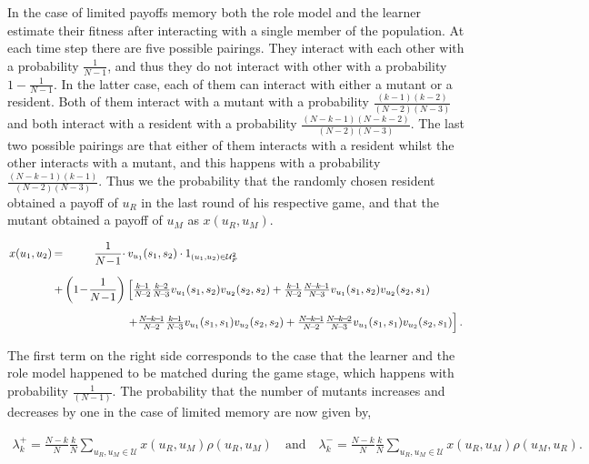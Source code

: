 \documentclass[11pt]{article}
\theoremstyle{plainCl1}
\theoremstyle{plainCl2}
\begin{document}
In the case of limited payoffs memory both the role model and the learner
estimate their fitness after interacting with a single member of the population.
At each time step there are five possible pairings. They interact with each
other with a probability \(\frac{1}{N - 1}\), and thus they do not interact with
other with a probability \(1 - \frac{1}{N - 1}\). In the latter case, each of
them can interact with either a mutant or a resident. Both of them interact with
a mutant with a probability $\frac{(k-1)(k-2)}{(N-2)(N-3)}$ and both interact
with a resident with a probability $\frac{(N-k-1)(N-k-2)}{(N-2)(N-3)}$. The last
two possible pairings are that either of them interacts with a resident whilst
the other interacts with a mutant, and this happens with a probability
$\frac{(N-k-1)(k-1)}{(N-2)(N-3)}$. Thus we the probability that the randomly
chosen resident obtained a payoff of $u_R$ in the last round of his respective
game, and that the mutant obtained a payoff of $u_M$ as $x(u_R,u_M)$.

\begin{equation}\label{eq:Chi}
\setlength{\arraycolsep}{1pt}
\begin{array}{llrl}
x(u_1,u_2)	 &=&\displaystyle \frac{1}{N\!-\!1}\cdot  &v_{u_1}(s_1,s_2)\cdot 1_{(u_1,u_2)\in \mathcal{U}^2_F}\\[0.5cm]
&+	
&\displaystyle \left(1\!-\!\frac{1}{N\!-\!1}\right)  
&\left[ \frac{k\!-\!1}{N\!-\!2}\frac{k\!-\!2}{N\!-\!3} v_{u_1}(s_1,s_2) v_{u_2}(s_2,s_2) + 
 \frac{k\!-\!1}{N\!-\!2}\frac{N\!-\!k\!-\!1}{N\!-\!3} v_{u_1}(s_1,s_2) v_{u_2}(s_2,s_1)\right.\\[0.5cm]
&&&\left. +\frac{N\!-\!k\!-\!1}{N\!-\!2}\frac{k\!-\!1}{N\!-\!3} v_{u_1}(s_1,s_1) v_{u_2}(s_2,s_2) + 
 \frac{N\!-\!k\!-\!1}{N\!-\!2}\frac{N\!-\!k\!-\!2}{N\!-\!3} v_{u_1}(s_1,s_1) v_{u_2}(s_2,s_1)\right].
\end{array}
\end{equation}

The first term on the right side corresponds to the case that the learner and
the role model happened to be matched during the game stage, which happens with
probability $\frac{1}{(N\!-\!1)}$. The probability that the number of mutants
increases and decreases by one in the case of limited memory are now given by,

\begin{align}\label{eq:limited_memory_lambdas}
\lambda^+_k=\frac{N\!-\!k}{N} \frac{k}{N} \sum_{u_{R},u_{M}\in\mathcal{U}} x(u_{R},u_{M}) \rho(u_{R},u_{M}) \quad \text{and} \quad
\lambda^-_k=\frac{N\!-\!k}{N} \frac{k}{N} \sum_{u_{R},u_{M}\in\mathcal{U}} x(u_{R},u_{M}) \rho(u_{M},u_{R}).
\end{align}
\end{document}
